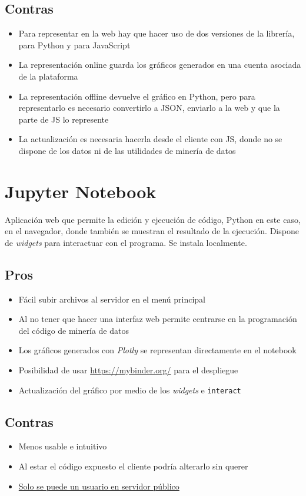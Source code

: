 \subsection{Contras}
\begin{itemize}
	\item Para representar en la web hay que hacer uso de dos versiones de la librería, para Python y para JavaScript
	\item La representación online guarda los gráficos generados en una cuenta asociada de la plataforma
	\item La representación offline devuelve el gráfico en Python, pero para representarlo es necesario convertirlo a JSON, enviarlo a la web y que la parte de JS lo represente
	\item La actualización es necesaria hacerla desde el cliente con JS, donde no se dispone de los datos ni de las utilidades de minería de datos
\end{itemize}

\section{Jupyter Notebook}
Aplicación web que permite la edición y ejecución de código, Python en este caso, en el navegador, donde también se muestran el resultado de la ejecución. Dispone de \textit{widgets} para interactuar con el programa. Se instala localmente.
\subsection{Pros}
\begin{itemize}
	\item Fácil subir archivos al servidor en el menú principal
	\item Al no tener que hacer una interfaz web permite centrarse en la programación del código de minería de datos
	\item Los gráficos generados con \textit{Plotly} se representan directamente en el notebook
	\item Posibilidad de usar \url{https://mybinder.org/} para el despliegue
	\item Actualización del gráfico por medio de los \textit{widgets} e \verb|interact|
\end{itemize}
\subsection{Contras}
\begin{itemize}
	\item Menos usable e intuitivo
	\item Al estar el código expuesto el cliente podría alterarlo sin querer
	\item \href{http://jupyter-notebook.readthedocs.io/en/latest/public_server.html}{Solo se puede un usuario en servidor público}
\end{itemize}

